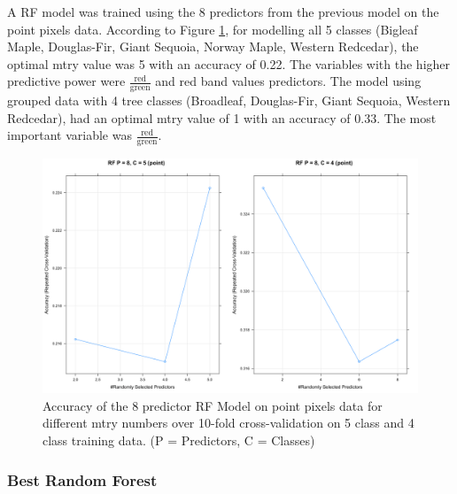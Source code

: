 \documentclass[12pt,twoside]{reedthesis}
\begin{document}
A RF model was trained using the 8 predictors from the previous model on the point pixels data. According to Figure \ref{fig:rf8c}, for modelling all 5 classes (Bigleaf Maple, Douglas-Fir, Giant Sequoia, Norway Maple, Western Redcedar), the optimal mtry value was 5 with an accuracy of 0.22. The variables with the higher predictive power were \(\frac{\mbox{red}}{\mbox{green}}\) and red band values predictors. The model using grouped data with 4 tree classes (Broadleaf, Douglas-Fir, Giant Sequoia, Western Redcedar), had an optimal mtry value of 1 with an accuracy of 0.33. The most important variable was \(\frac{\mbox{red}}{\mbox{green}}\).
\begin{figure}

{\centering \includegraphics[width=0.9\linewidth]{figure/rf8c_mtry} 

}

\caption{Accuracy of the 8 predictor RF Model on point pixels data for different mtry numbers over 10-fold cross-validation on 5 class and 4 class training data. (P = Predictors, C = Classes)}\label{fig:rf8c}
\end{figure}
\hypertarget{best-random-forest}{%
\subsubsection{Best Random Forest}\label{best-random-forest}}
\end{document}
